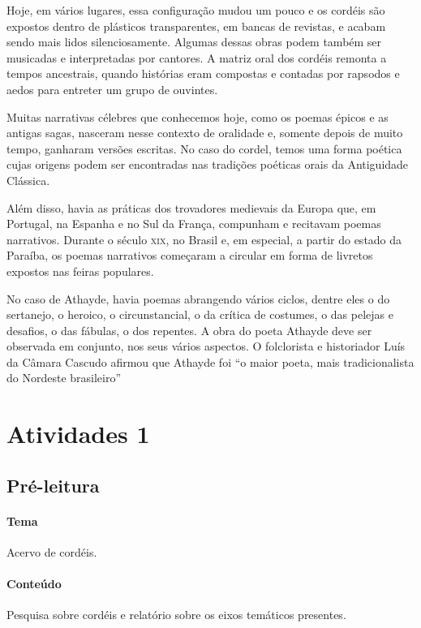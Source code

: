 \documentclass[12pt]{extarticle}
\begin{document}
Hoje, em vários lugares, essa configuração mudou um pouco e os cordéis são expostos dentro de plásticos transparentes, em bancas de revistas, e acabam sendo mais lidos silenciosamente. Algumas dessas obras podem também ser musicadas e interpretadas por cantores. A matriz oral dos cordéis remonta a tempos ancestrais, quando histórias eram compostas e contadas por rapsodos e aedos para entreter um grupo de ouvintes.

Muitas narrativas célebres que conhecemos hoje, como os poemas épicos e as antigas sagas, nasceram nesse contexto de oralidade e, somente depois de muito tempo, ganharam versões escritas. No caso do cordel, temos uma forma poética cujas origens podem ser encontradas nas tradições poéticas orais da Antiguidade Clássica.

Além disso, havia as práticas dos trovadores medievais da Europa que, em Portugal, na Espanha e no Sul da França, compunham e recitavam poemas narrativos. Durante o século \textsc{xix}, no Brasil e, em especial, a partir do estado da Paraíba, os poemas narrativos começaram a circular em forma de livretos expostos nas feiras populares.

No caso de Athayde, havia poemas abrangendo vários ciclos, dentre eles o do sertanejo, o heroico, o circunstancial, o da crítica de costumes, o das pelejas e desafios, o das fábulas, o dos repentes. A obra do poeta Athayde deve ser observada em conjunto, nos seus vários aspectos. O folclorista e historiador Luís da Câmara Cascudo afirmou que Athayde foi ``o maior poeta, mais tradicionalista do Nordeste brasileiro''


\section{Atividades 1}


\subsection{Pré-leitura}


\paragraph{Tema} Acervo de cordéis.

\paragraph{Conteúdo} Pesquisa sobre cordéis e relatório sobre os eixos temáticos presentes.
\end{document}
